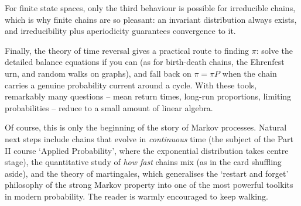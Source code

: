 For finite state spaces, only the third behaviour is possible for irreducible chains, which is why finite chains are so pleasant: an invariant distribution always exists, and irreducibility plus aperiodicity guarantees convergence to it.

Finally, the theory of time reversal gives a practical route to finding $\pi$: solve the detailed balance equations if you can (as for birth-death chains, the Ehrenfest urn, and random walks on graphs), and fall back on $\pi = \pi P$ when the chain carries a genuine probability current around a cycle. With these tools, remarkably many questions -- mean return times, long-run proportions, limiting probabilities -- reduce to a small amount of linear algebra.

Of course, this is only the beginning of the story of Markov processes. Natural next steps include chains that evolve in \emph{continuous} time (the subject of the Part II course `Applied Probability', where the exponential distribution takes centre stage), the quantitative study of \emph{how fast} chains mix (as in the card shuffling aside), and the theory of martingales, which generalises the `restart and forget' philosophy of the strong Markov property into one of the most powerful toolkits in modern probability. The reader is warmly encouraged to keep walking.

